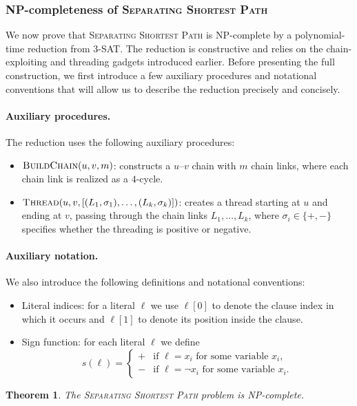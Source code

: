 \documentclass[journal ]{new-aiaa}
\numberwithin{equation}{section}
\theoremstyle{definition}
\theoremstyle{plain}
\newtheorem{theorem}[definition]{Theorem}
\theoremstyle{remark}
\begin{document}
\subsubsection{NP-completeness of \textsc{Separating Shortest Path}}
We now prove that \textsc{Separating Shortest Path} is NP-complete by a polynomial-time reduction from \textsc{3-SAT}.  
The reduction is constructive and relies on the chain-exploiting and threading gadgets introduced earlier. Before presenting the full construction, we first introduce a few auxiliary procedures and notational conventions that will allow us to describe the reduction precisely and concisely.

\paragraph{Auxiliary procedures.}
The reduction uses the following auxiliary procedures:
\begin{itemize}
    \item $\textsc{BuildChain}(u,v,m)$: constructs a $u$--$v$ chain with $m$ chain links, where each chain link is realized as a $4$-cycle.
    \item $\textsc{Thread}(u,v,[(L_1,\sigma_1),\dots,(L_k,\sigma_k)])$: creates a thread starting at $u$ and ending at $v$, passing through the chain links $L_1,\dots,L_k$, where $\sigma_i \in \{+,-\}$ specifies whether the threading is positive or negative.
\end{itemize}

\paragraph{Auxiliary notation.}
We also introduce the following definitions and notational conventions:
\begin{itemize}
    \item Literal indices: for a literal $\ell$ we use $\ell[0]$ to denote the clause index in which it occurs and $\ell[1]$ to denote its position inside the clause.
    \item Sign function: for each literal $\ell$ we define
\[
s(\ell) = 
\begin{cases}
+ & \text{if $\ell = x_i$ for some variable $x_i$,}\\
- & \text{if $\ell = \neg x_i$ for some variable $x_i$.}
\end{cases}
\]
\end{itemize}

\begin{theorem}
\label{theorem:separating_shortest_path_np_complete}
The \textsc{Separating Shortest Path} problem is NP-complete.
\end{theorem}
\end{document}
